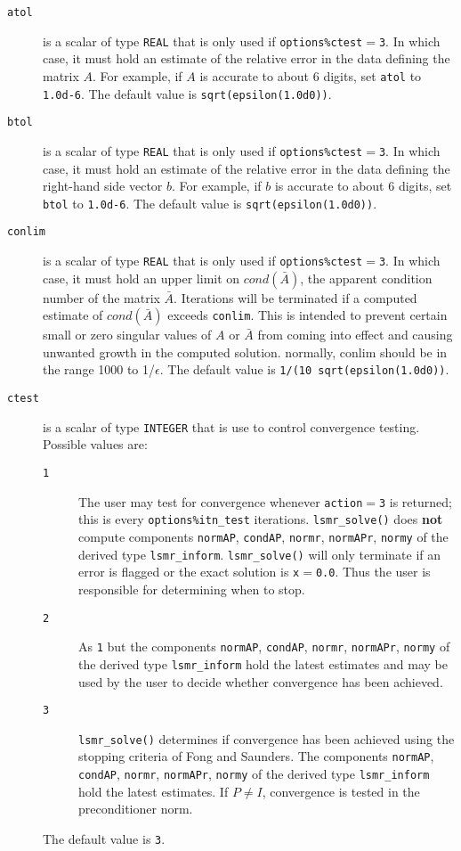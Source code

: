 \begin{description}

\item[\texttt{atol}] is a scalar of type {\tt REAL} that is only used if
   {\tt options\%ctest}$ =${\tt 3}.
   In which case, it must hold an estimate of the relative error in the data
   defining the matrix $A$.  For example, if $A$ is accurate to about 6 digits,
   set {\tt atol} to {\tt 1.0d-6}. The default value is {\tt sqrt(epsilon(1.0d0))}.

\item[\texttt{btol}] is a scalar of type {\tt REAL} that is only used if
   {\tt options\%ctest}$ =${\tt 3}.
   In which case, it must hold an estimate of the relative error in the data
   defining the right-hand side vector $ b$.  For example, if $b$ is
   accurate to about 6 digits, set {\tt btol} to {\tt 1.0d-6}. The default value is 
   {\tt sqrt(epsilon(1.0d0))}.


\item[\texttt{conlim}] is a scalar of type {\tt REAL} that is only used if
   {\tt options\%ctest}$ =${\tt 3}.
   In which case, it must hold an upper limit on $cond(\bar{A})$, the apparent
   condition number of the matrix $\bar{A}$. Iterations will be terminated 
   if a computed estimate of $cond(\bar{A})$ exceeds {\tt conlim}.
   This is intended to prevent certain small or
   zero singular values of $A$ or $\bar{A}$ from
   coming into effect and causing unwanted growth in the computed solution.
   normally, conlim should be in the range 1000 to 1/$\epsilon$.
   The default value is {\tt 1/(10 sqrt(epsilon(1.0d0))}.

\item[\texttt{ctest}] is a scalar of type {\tt INTEGER} that is use to control
   convergence testing. Possible values are:
   \begin{description}
   \item[\texttt{1}] The user may test for convergence whenever 
      {\tt action}$ = ${\tt 3} is returned; this is
      every {\tt options\%itn\_test} iterations.
      {\tt lsmr\_solve()} does {\bf not} compute components
      {\tt normAP}, {\tt condAP}, {\tt normr}, {\tt normAPr}, {\tt normy}
      of the derived type {\tt lsmr\_inform}.
      {\tt lsmr\_solve()} will only terminate if an  error is flagged
      or the exact solution is {\tt x}$ = ${\tt 0.0}.
      Thus the user is responsible for determining when to stop.
   \item[\texttt{2}] As {\texttt 1} but the components
      {\tt normAP}, {\tt condAP}, {\tt normr}, {\tt normAPr}, {\tt normy}
      of the derived type {\tt lsmr\_inform} hold the latest estimates and
      may be used by the user to decide whether convergence has been achieved.
   \item[\texttt{3}] {\tt lsmr\_solve()} determines if convergence has been achieved
      using the stopping criteria of Fong and Saunders. The components
      {\tt normAP}, {\tt condAP}, {\tt normr}, {\tt normAPr}, {\tt normy}
      of the derived type {\tt lsmr\_inform} hold the latest estimates.
      If $P \neq I$,  convergence is tested in the
      preconditioner norm.
   \end{description}
   The default value is {\tt 3}.


\end{description}
